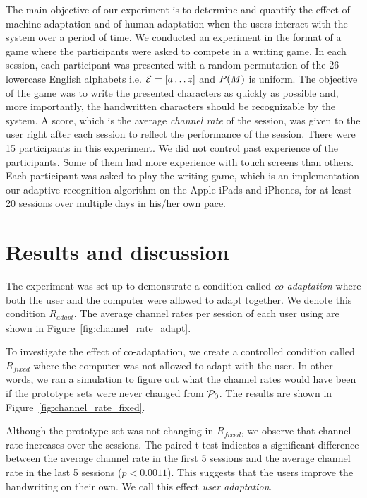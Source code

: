 \documentclass{sigchi}
\begin{document}
The main objective of our experiment is to determine and quantify the
effect of machine adaptation and of human adaptation when the users
interact with the system over a period of time.  We conducted an
experiment in the format of a game where the participants were asked
to compete in a writing game. In each session, each participant was
presented with a random permutation of the 26 lowercase English
alphabets i.e. $\mathcal{E} = \left[ a \ldots z \right]$ and
$P(M)$ is uniform. The objective of the game was to write the
presented characters as quickly as possible and, more importantly, the
handwritten characters should be recognizable by the system. A score,
which is the average {\it channel rate} of the session, was given to
the user right after each session to reflect the performance of the
session. There were 15 participants in this experiment. We did not
control past experience of the participants. Some of them had more
experience with touch screens than others. Each participant was asked
to play the writing game, which is an implementation our adaptive
recognition algorithm on the Apple iPads and iPhones, for at least 20
sessions over multiple days in his/her own pace.


\section{Results and discussion}
\label{sec:results}

The experiment was set up to demonstrate a condition called {\em
  co-adaptation} where both the user and the computer were allowed to
adapt together. We denote this condition $R_{adapt}$. The average
channel rates per session of each user using are shown in
Figure~\ref{fig:channel_rate_adapt}. 

To investigate the effect of co-adaptation, we create a controlled 
condition called $R_{fixed}$ where the computer was not allowed to
adapt with the user. In other words, we ran a simulation to figure out what the
channel rates would have been if the prototype sets were never changed
from $\mathcal{P}_0$. The results are shown in
Figure~\ref{fig:channel_rate_fixed}.

Although the prototype set was not changing in $R_{fixed}$, we observe
that channel rate increases over the sessions. The paired t-test
indicates a significant difference between the average channel rate in
the first 5 sessions and the average channel rate in the last 5
sessions ($p < 0.0011$). This suggests that the users improve the
handwriting on their own. We call this effect {\em user
  adaptation}.
\end{document}
